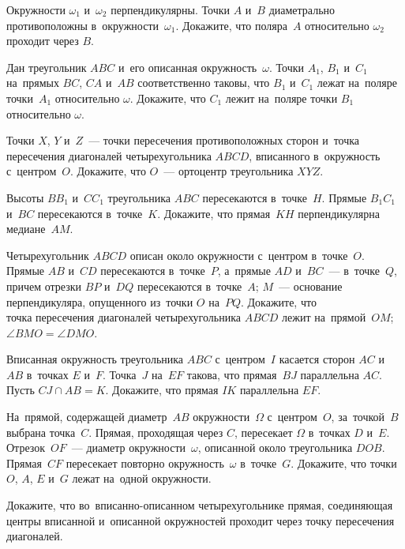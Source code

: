 


\begin{problems}

\item
Окружности $\omega_{1}$ и~$\omega_{2}$ перпендикулярны.
Точки $A$ и~$B$ диаметрально противоположны в~окружности~$\omega_{1}$.
Докажите, что поляра~$A$ относительно $\omega_{2}$ проходит через $B$.

\item
Дан треугольник $ABC$ и~его описанная окружность~$\omega$.
Точки $A_{1}$, $B_{1}$ и~$C_{1}$ на~прямых $BC$, $CA$ и~$AB$ соответственно
таковы, что $B_{1}$ и~$C_{1}$ лежат на~поляре точки~$A_{1}$
относительно $\omega$.
Докажите, что $C_{1}$ лежит на~поляре точки $B_{1}$ относительно $\omega$.

\item
Точки $X$, $Y$ и~$Z$~--- точки пересечения противоположных сторон и~точка
пересечения диагоналей четырехугольника $ABCD$, вписанного в~окружность
с~центром~$O$.
Докажите, что $O$~--- ортоцентр треугольника $XYZ$.

\item
Высоты $BB_{1}$ и~$CC_{1}$ треугольника $ABC$ пересекаются в~точке~$H$.
Прямые $B_{1}C_{1}$ и~$BC$ пересекаются в~точке~$K$.
Докажите, что прямая~$KH$ перпендикулярна медиане~$AM$.

\item
Четырехугольник $ABCD$ описан около окружности с~центром в~точке~$O$.
Прямые $AB$ и~$CD$ пересекаются в~точке~$P$, а~прямые $AD$ и~$BC$~---
в~точке~$Q$, причем отрезки $BP$ и~$DQ$ пересекаются в~точке~$A$;
$M$~--- основание перпендикуляра, опущенного из~точки $O$ на~$PQ$.
Докажите, что
\\
\subproblem
точка пересечения диагоналей четырехугольника $ABCD$ лежит на~прямой~$OM$;
\\
\subproblem
$\angle BMO = \angle DMO$.

\item
Вписанная окружность треугольника $ABC$ с~центром~$I$ касается
сторон $AC$ и~$AB$ в~точках $E$ и~$F$.
Точка~$J$ на~$EF$ такова, что прямая~$BJ$ параллельна $AC$.
Пусть $CJ \cap AB = K$.
Докажите, что прямая $IK$ параллельна $EF$.

\item
На~прямой, содержащей диаметр~$AB$ окружности~$\Omega$ с~центром~$O$,
за~точкой~$B$ выбрана точка~$C$.
Прямая, проходящая через $C$, пересекает $\Omega$ в~точках $D$ и~$E$.
Отрезок~$OF$~--- диаметр окружности~$\omega$, описанной около
треугольника $DOB$.
Прямая~$CF$ пересекает повторно окружность~$\omega$ в~точке~$G$.
Докажите, что точки $O$, $A$, $E$ и~$G$ лежат на~одной окружности.

\item
Докажите, что во~вписанно-описанном четырехугольнике прямая, соединяющая центры
вписанной и~описанной окружностей проходит через точку пересечения диагоналей.

\end{problems}

